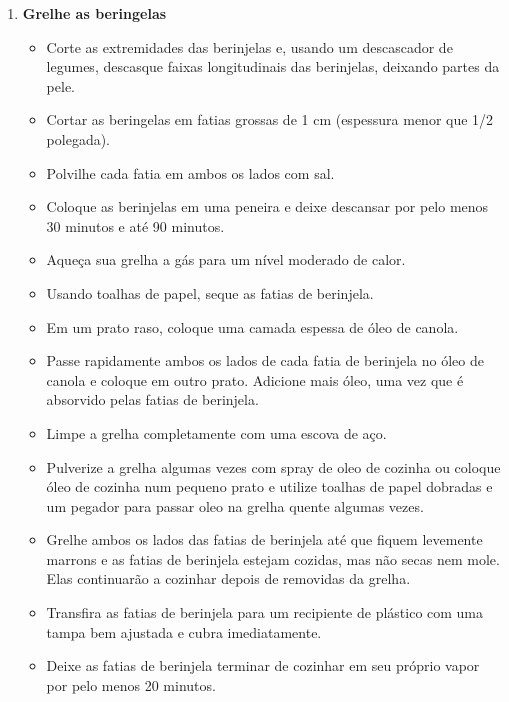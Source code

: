 \documentclass [11pt, papel de carta] {article}
\begin{document}
\begin {description}
\begin {enumerate}
\begin {itemize}
\item Retire do forno e mantenha quente até estar pronto para montar o prato.
\end {itemize}
\item {\bf Grelhe as beringelas}
\begin {itemize}
\item Corte as extremidades das berinjelas e, usando um descascador de legumes, descasque faixas longitudinais das berinjelas, deixando partes da pele.
\item Cortar as beringelas em fatias grossas de 1 cm (espessura menor que 1/2 polegada).
\item Polvilhe cada fatia em ambos os lados com sal.
\item Coloque as berinjelas em uma peneira e deixe descansar por pelo menos 30 minutos e até 90 minutos.
\item Aqueça sua grelha a gás para um nível moderado de calor.
\item Usando toalhas de papel, seque as fatias de berinjela.
\item Em um prato raso, coloque uma camada espessa de óleo de canola.
\item Passe rapidamente ambos os lados de cada fatia de berinjela no óleo de canola e coloque em outro prato. Adicione mais óleo, uma vez que é absorvido pelas fatias de berinjela.
\item Limpe a grelha completamente com uma escova de aço.
\item Pulverize a grelha algumas vezes com spray de oleo de cozinha ou coloque óleo de cozinha num pequeno prato e utilize toalhas de papel dobradas e um pegador para passar oleo na grelha quente algumas vezes.
\item Grelhe ambos os lados das fatias de berinjela até que fiquem levemente marrons e as fatias de berinjela estejam cozidas, mas não secas nem mole. Elas continuarão a cozinhar depois de removidas da grelha.
\item Transfira as fatias de berinjela para um recipiente de plástico com uma tampa bem ajustada e cubra imediatamente.
\item Deixe as fatias de berinjela terminar de cozinhar em seu próprio vapor por pelo menos 20 minutos.
\end {itemize}


\end{enumerate}
\end{description}
\end{document}
